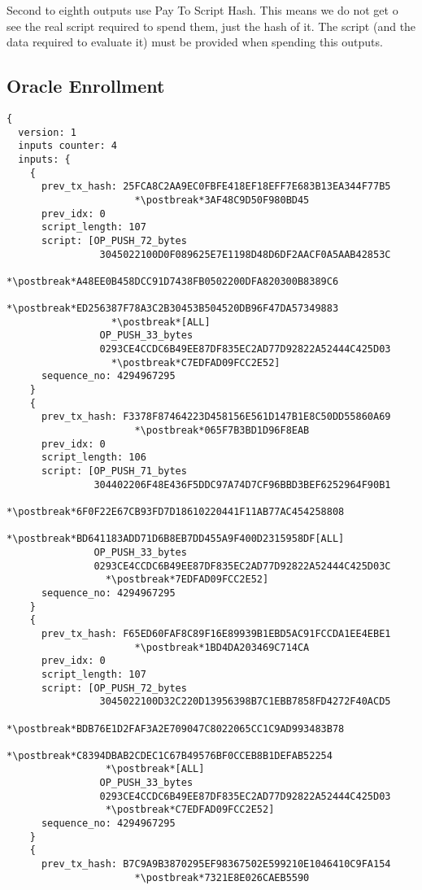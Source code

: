 Second to eighth outputs use Pay To Script Hash.
This means we do not get o see the real script required to spend them, just the
  hash of it.
The script (and the data required to evaluate it) must be provided when spending
  this outputs.

\subsection{Oracle Enrollment}

\begin{lstlisting}
{
  version: 1
  inputs counter: 4
  inputs: {
    {
      prev_tx_hash: 25FCA8C2AA9EC0FBFE418EF18EFF7E683B13EA344F77B5
                      *\postbreak*3AF48C9D50F980BD45
      prev_idx: 0
      script_length: 107
      script: [OP_PUSH_72_bytes
                3045022100D0F089625E7E1198D48D6DF2AACF0A5AAB42853C
                  *\postbreak*A48EE0B458DCC91D7438FB0502200DFA820300B8389C6
                  *\postbreak*ED256387F78A3C2B30453B504520DB96F47DA57349883
                  *\postbreak*[ALL]
                OP_PUSH_33_bytes
                0293CE4CCDC6B49EE87DF835EC2AD77D92822A52444C425D03
                  *\postbreak*C7EDFAD09FCC2E52]
      sequence_no: 4294967295
    }
    {
      prev_tx_hash: F3378F87464223D458156E561D147B1E8C50DD55860A69
                      *\postbreak*065F7B3BD1D96F8EAB
      prev_idx: 0
      script_length: 106
      script: [OP_PUSH_71_bytes
               304402206F48E436F5DDC97A74D7CF96BBD3BEF6252964F90B1
                 *\postbreak*6F0F22E67CB93FD7D18610220441F11AB77AC454258808
                 *\postbreak*BD641183ADD71D6B8EB7DD455A9F400D2315958DF[ALL]
               OP_PUSH_33_bytes
               0293CE4CCDC6B49EE87DF835EC2AD77D92822A52444C425D03C
                 *\postbreak*7EDFAD09FCC2E52]
      sequence_no: 4294967295
    }
    {
      prev_tx_hash: F65ED60FAF8C89F16E89939B1EBD5AC91FCCDA1EE4EBE1
                      *\postbreak*1BD4DA203469C714CA
      prev_idx: 0
      script_length: 107
      script: [OP_PUSH_72_bytes
                3045022100D32C220D13956398B7C1EBB7858FD4272F40ACD5
                 *\postbreak*BDB76E1D2FAF3A2E709047C8022065CC1C9AD993483B78
                 *\postbreak*C8394DBAB2CDEC1C67B49576BF0CCEB8B1DEFAB52254
                 *\postbreak*[ALL]
                OP_PUSH_33_bytes
                0293CE4CCDC6B49EE87DF835EC2AD77D92822A52444C425D03
                 *\postbreak*C7EDFAD09FCC2E52]
      sequence_no: 4294967295
    }
    {
      prev_tx_hash: B7C9A9B3870295EF98367502E599210E1046410C9FA154
                      *\postbreak*7321E8E026CAEB5590

\end{lstlisting}
